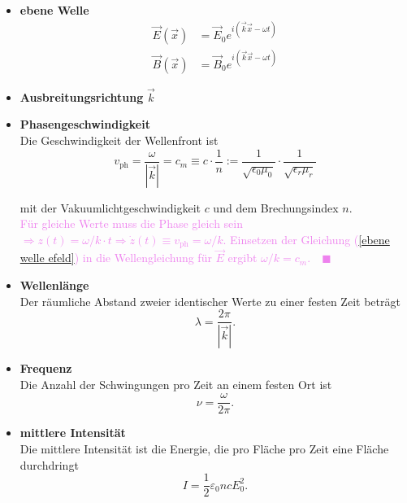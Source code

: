\documentclass{article}
\begin{document}
	\begin{itemize}
		\item \textbf{ebene Welle}
			\begin{align}
				\label{ebene welle efeld}
				\vec{E}(\vec{x}) &= \vec{E}_0 e^{i(\vec{k}\vec{x} - \omega t)} \\
				\vec{B}(\vec{x}) &= \vec{B}_0 e^{i(\vec{k}\vec{x} - \omega t)}
			\end{align}
			\item \textbf{Ausbreitungsrichtung} $\vec{k}$

		
			\item \textbf{Phasengeschwindigkeit}\\
			 Die Geschwindigkeit der Wellenfront ist
				\begin{equation}
					v_\text{ph} = \frac{\omega}{|\vec{k}|} = c_m \equiv c\cdot \frac{1}{n} := \frac{1}{\sqrt{\epsilon_0\mu_0}} \cdot \frac{1}{\sqrt{\epsilon_r\mu_r}}
				\end{equation}

			mit der Vakuumlichtgeschwindigkeit $c$ und dem Brechungsindex $n$.\\
			\textcolor{violet}{Für gleiche Werte muss die Phase gleich sein $\Rightarrow z(t) = \omega/k \cdot t \Rightarrow \dot{z}(t) \equiv v_\text{ph} = \omega/k$. Einsetzen der Gleichung (\ref{ebene welle efeld}) in die Wellengleichung für $\vec{E}$ ergibt $\omega/k = c_m. \quad \blacksquare$}


			\item \textbf{Wellenlänge}\\
			Der räumliche Abstand zweier identischer Werte zu einer festen Zeit beträgt
				\begin{equation}
					\lambda = \frac{2\pi}{|\vec{k}|}.
				\end{equation}

			
			\item \textbf{Frequenz}\\
			Die Anzahl der Schwingungen pro Zeit an einem festen Ort ist
				\begin{equation}
					\nu = \frac{\omega}{2\pi}.
				\end{equation}


			\item \textbf{mittlere Intensität}\\
			Die mittlere Intensität ist die Energie, die pro Fläche pro Zeit eine Fläche durchdringt
				\begin{equation}
					I = \frac{1}{2}\varepsilon_0 n c E_0^2.
				\end{equation}



\end{itemize}
\end{document}

